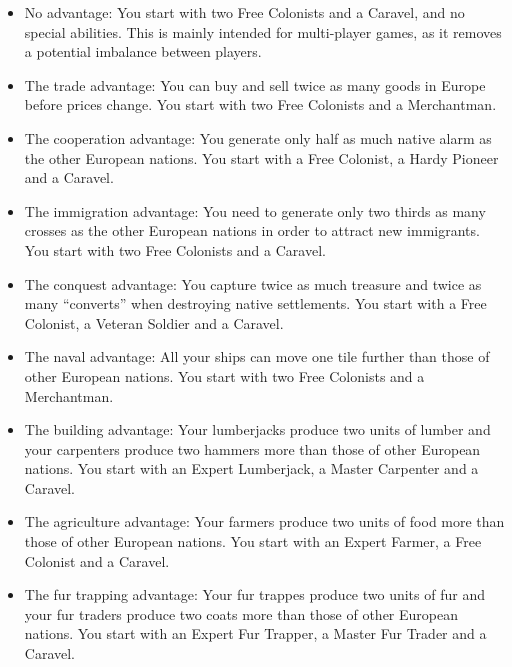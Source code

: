 \documentclass[12pt]{book}
\begin{document}
\begin{itemize}

\item No advantage: You start with two Free Colonists and a Caravel,
  and no special abilities. This is mainly intended for multi-player
  games, as it removes a potential imbalance between players.

\item The trade advantage: You can buy and sell twice as many goods in
  Europe before prices change. You start with two Free Colonists and a
  Merchantman.

\item The cooperation advantage: You generate only half as much native
  alarm as the other European nations. You start with a Free Colonist,
  a Hardy Pioneer and a Caravel.

\item The immigration advantage: You need to generate only two thirds
  as many crosses as the other European nations in order to attract
  new immigrants. You start with two Free Colonists and a Caravel.

\item The conquest advantage: You capture twice as much treasure and
  twice as many ``converts'' when destroying native settlements. You
  start with a Free Colonist, a Veteran Soldier and a Caravel.

\item The naval advantage: All your ships can move one tile further
  than those of other European nations. You start with two Free
  Colonists and a Merchantman.

\item The building advantage: Your lumberjacks produce two units of
  lumber and your carpenters produce two hammers more than those of
  other European nations. You start with an Expert Lumberjack, a
  Master Carpenter and a Caravel.

\item The agriculture advantage: Your farmers produce two units of
  food more than those of other European nations. You start with an
  Expert Farmer, a Free Colonist and a Caravel.

\item The fur trapping advantage: Your fur trappes produce two units
  of fur and your fur traders produce two coats more than those of
  other European nations. You start with an Expert Fur Trapper, a
  Master Fur Trader and a Caravel.

\end{itemize}
\end{document}
